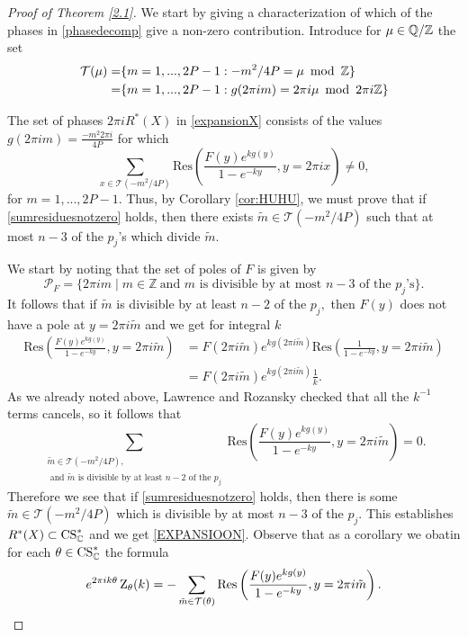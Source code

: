 \begin{proof}[Proof of Theorem \ref{2.1}]
We start by giving a characterization of which of the phases in \eqref{phasedecomp} give a non-zero contribution. Introduce for $\mu \in \mathbb{Q}/ \mathbb{Z}$ the set 
\begin{align}\label{R}
\mathcal{T}(\mu) = & \{m=1,...,2P -1 :-m^2/4P=\mu \ \modu \ \mathbb{Z} \}
\\ =& \{m=1,...,2P -1 :g(2\pi i m)=2\pi i \mu \ \modu \ 2\pi i\mathbb{Z} \}
\end{align}

The set of phases $ 2\pi i R^*(X)$ in \eqref{expansionX} consists of the values $g(2\pi i m)=  \frac{-m^2 2\pi i}{4P}$ for which 
\begin{equation} \label{sumresiduesnotzero}
\sum_{x \in \mathcal{T}(-m^2/4P)} \text{Res} \left( \frac{F(y)e^{kg(y)}}{1-e^{-ky}}, y=2\pi i x \right) \not=0,
\end{equation}
for $m=1,...,2P-1$.
Thus, by Corollary \ref{cor:HUHU}, we must prove that if \eqref{sumresiduesnotzero} holds, then there exists $\tilde m \in \mathcal{T}(-m^2/4P)$ such that at most $n-3$ of the $p_j$'s which divide $\tilde m$. 



We start by noting that the set of poles of $F$ is given by
\begin{equation} \label{PolesofF}
\mathcal{P}_F=\{ 2\pi im \mid m \in \mathbb{Z} \ \text{and $m$ is divisible by at most $n-3$ of the $p_j$'s} \}.
\end{equation} 
It follows that if $\tilde m$ is divisible by at least $n-2$ of the $p_j,$ then $F(y)$ does not have a pole at $y=2\pi i \tilde m$ and we get for integral $k$
\begin{align}
\text{Res} \left( \frac{F(y)e^{kg(y)}}{1-e^{-ky}}, y=2\pi i \tilde m \right)&=F(2 \pi i \tilde m) e^{kg(2\pi i\tilde m)} \text{Res} \left(\frac{1}{1-e^{-ky}}, y=2\pi i \tilde m \right)
\\ &=F(2 \pi i \tilde m) e^{kg(2\pi i\tilde m)}\frac{1}{k}. \end{align}
As we already noted above, Lawrence and Rozansky checked that all the $k^{-1}$ terms cancels, so it follows that 
\begin{equation}
\sum_{\substack{\tilde m \in \mathcal{T}(-m^2/4P), \\ \text{ and $\tilde{m}$ is divisible by at least $n-2$ of the $p_j$}}}  \text{Res} \left( \frac{F(y)e^{kg(y)}}{1-e^{-ky}}, y=2\pi i \tilde m \right)=0.
\end{equation}
Therefore we see that if \eqref{sumresiduesnotzero} holds, then there is some $\tilde{m} \in \mathcal{T}(-m^2/4P)$ which is divisible by at most $n-3$ of the $p_j.$ 
This establishes  $R^*(X) \subset \operatorname{CS}_{\mathbb{C}}^*$ and we get \eqref{EXPANSIOON}. Observe that as a corollary we obatin for each $\theta \in \operatorname{CS}_{\mathbb{C}}^*$ the formula
\begin{equation} \label{eq:formulaforpolynomial}
e^{2\pi ik \theta} \operatorname{Z}_{\theta}(k)=- \sum_{\tilde m \in \mathcal{T}(\theta)}  \text{Res} \left( \frac{F(y)e^{kg(y)}}{1-e^{-ky}}, y=2\pi i \tilde m \right).
\end{equation}



\end{proof}
